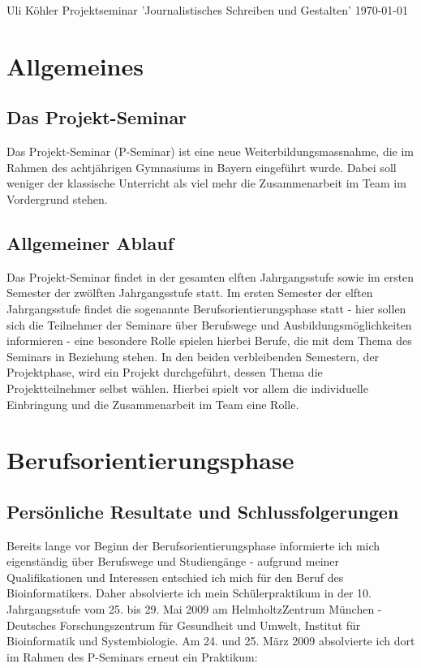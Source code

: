 \documentclass[a4paper,12pt,twoside]{scrbook}
\begin{document}
\begin{titlepage}
\begin{center}
\fontsize{14pt}{14pt}\selectfont
\vspace*{\fill}{\large Ernst-Mach-Gymnasium Haar}
\vfill {{\Huge \bfseries {}}}
\vfill {\large Uli Köhler}
\vfill {\large Projektseminar 'Journalistisches Schreiben und Gestalten'}
\vfill {\today}
\end{center}\vspace*{\fill}	
\end{titlepage}
\tableofcontents
\newpage
\chapter{Allgemeines}
\section{Das Projekt-Seminar}
Das Projekt-Seminar (P-Seminar) ist eine neue Weiterbildungsmassnahme, die im Rahmen des achtjährigen Gymnasiums in Bayern eingeführt wurde.
Dabei soll weniger der klassische Unterricht als viel mehr die Zusammenarbeit im Team im Vordergrund stehen.
\section{Allgemeiner Ablauf}
Das Projekt-Seminar findet in der gesamten elften Jahrgangsstufe sowie im ersten Semester der zwölften Jahrgangsstufe statt.
Im ersten Semester der elften Jahrgangsstufe findet die sogenannte Berufsorientierungsphase statt - hier sollen sich die Teilnehmer der Seminare über Berufswege und Ausbildungsmöglichkeiten informieren -
eine besondere Rolle spielen hierbei Berufe, die mit dem Thema des Seminars in Beziehung stehen.
In den beiden verbleibenden Semestern, der Projektphase, wird ein Projekt durchgeführt, dessen Thema die Projektteilnehmer selbst wählen.
Hierbei spielt vor allem die individuelle Einbringung und die Zusammenarbeit im Team eine Rolle.
\chapter{Berufsorientierungsphase}
\section{Persönliche Resultate und Schlussfolgerungen}
Bereits lange vor Beginn der Berufsorientierungsphase informierte ich mich eigenständig über Berufswege und Studiengänge - aufgrund meiner Qualifikationen und Interessen entschied ich mich für den Beruf des Bioinformatikers.
Daher absolvierte ich mein Schülerpraktikum in der 10. Jahrgangsstufe vom 25. bis 29. Mai 2009 am HelmholtzZentrum München - Deutsches Forschungszentrum für Gesundheit und Umwelt, Institut für Bioinformatik und Systembiologie.
Am 24. und 25. März 2009 absolvierte ich dort im Rahmen des P-Seminars erneut ein Praktikum:
\end{document}
